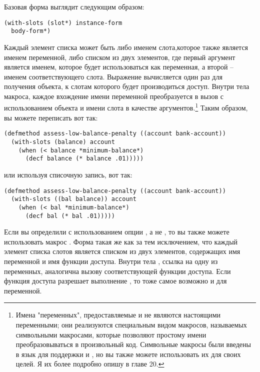 Базовая форма   выглядит следующим образом:

\begin{lstlisting}
(with-slots (slot*) instance-form
  body-form*)
\end{lstlisting}

Каждый элемент списка  может быть либо именем слота,которое также является
именем переменной, либо списком из двух элементов, где первый аргумент является именем,
которое будет использоваться как переменная, а второй -- именем соответствующего слота.
Выражение  вычисляется один раз для получения объекта, к слотам
которого будет производиться доступ.  Внутри тела макроса, каждое вхождение имени
переменной преобразуется в вызов  с использованием объекта и имени слота
в качестве аргументов.\footnote{Имена "переменных", предоставляемые  и
   не являются настоящими переменными; они реализуются специальным
  видом макросов, называемых символьными макросами, которые позволяют простому имени
  преобразовываться в произвольный код.  Символьные макросы были введены в язык для
  поддержки  и , но вы также можете использовать их
  для своих целей.  Я их более подробно опишу в главе 20.}  Таким образом, вы можете
переписать  вот так:

\begin{lstlisting}
(defmethod assess-low-balance-penalty ((account bank-account))
  (with-slots (balance) account
    (when (< balance *minimum-balance*)
      (decf balance (* balance .01)))))
\end{lstlisting}

или используя списочную запись, вот так:

\begin{lstlisting}
(defmethod assess-low-balance-penalty ((account bank-account))
  (with-slots ((bal balance)) account
    (when (< bal *minimum-balance*)
      (decf bal (* bal .01)))))
\end{lstlisting}

Если вы определили  с использованием опции , а не
, то вы также можете использовать макрос .  Форма
 такая же как  за тем исключением, что каждый
элемент списка слотов является списком из двух элементов, содержащих имя переменной и имя
функции доступа.  Внутри тела , ссылка на одну из переменных,
аналогична вызову соответствующей функции доступа.  Если функция доступа разрешает
выполнение , то тоже самое возможно и для переменной.

